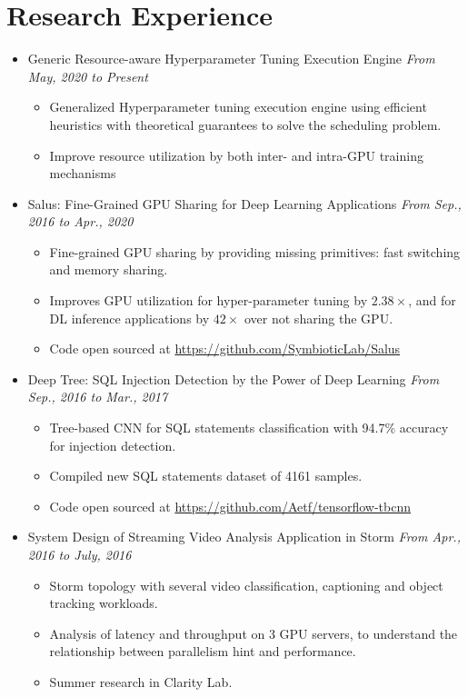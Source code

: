 \documentclass[letterpaper,11pt]{article}
\begin{document}
\section{Research Experience}
\begin{itemize}
    \item Generic Resource-aware Hyperparameter Tuning Execution
    Engine \hfill \textit{From May, 2020 to Present}
    \begin{itemize}
        \item Generalized Hyperparameter tuning execution engine using efficient
        heuristics with theoretical guarantees to solve the scheduling problem.
        \item Improve resource utilization by both inter- and intra-GPU training
        mechanisms
    \end{itemize}
    \item Salus: Fine-Grained GPU Sharing for Deep Learning Applications \hfill \textit{From Sep., 2016 to Apr., 2020}
    \begin{itemize}
        \item Fine-grained GPU sharing by providing missing primitives: fast 
switching and memory sharing.
        \item Improves GPU utilization for hyper-parameter tuning by $2.38\times$, and for DL 
inference applications by $42\times$ over not sharing the GPU.
        \item Code open sourced at \url{https://github.com/SymbioticLab/Salus}
    \end{itemize}

    \item Deep Tree: SQL Injection Detection by the Power of Deep Learning \hfill \textit{From Sep., 2016 to Mar., 2017}
    \begin{itemize}
        \item Tree-based CNN for SQL statements classification with 94.7\% accuracy for injection 
detection.
        \item Compiled new SQL statements dataset of 4161 samples.
        \item Code open sourced at \url{https://github.com/Aetf/tensorflow-tbcnn}
    \end{itemize}

    \item System Design of Streaming Video Analysis Application in Storm \hfill \textit{From Apr., 2016 to July, 2016}
    \begin{itemize}
        \item Storm topology with several video classification, captioning and object tracking 
workloads.
        \item Analysis of latency and throughput on 3 GPU servers, to understand the relationship 
between parallelism hint and performance.
        \item Summer research in Clarity Lab.
    \end{itemize}


\end{itemize}
\end{document}
